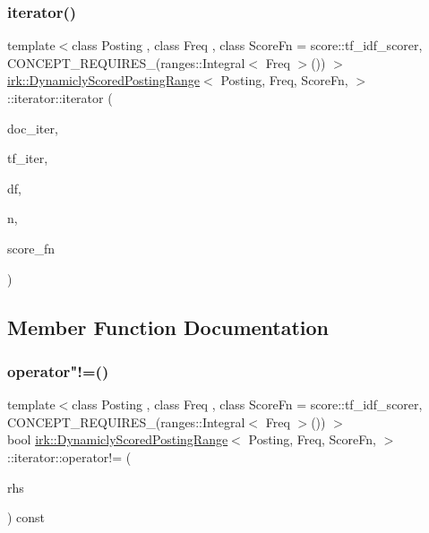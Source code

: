 \subsubsection{\texorpdfstring{iterator()}{iterator()}}
{\footnotesize\ttfamily template$<$class Posting , class Freq , class Score\+Fn  = score\+::tf\+\_\+idf\+\_\+scorer, C\+O\+N\+C\+E\+P\+T\+\_\+\+R\+E\+Q\+U\+I\+R\+E\+S\+\_\+(ranges\+::\+Integral$<$ Freq $>$()) $>$ \\
\mbox{\hyperlink{classirk_1_1DynamiclyScoredPostingRange}{irk\+::\+Dynamicly\+Scored\+Posting\+Range}}$<$ Posting, Freq, Score\+Fn, $>$\+::iterator\+::iterator (\begin{DoxyParamCaption}\item[{typename std\+::vector$<$ Doc $>$\+::const\+\_\+iterator}]{doc\+\_\+iter,  }\item[{typename std\+::vector$<$ Freq $>$\+::const\+\_\+iterator}]{tf\+\_\+iter,  }\item[{Freq}]{df,  }\item[{std\+::size\+\_\+t}]{n,  }\item[{Score\+Fn}]{score\+\_\+fn }\end{DoxyParamCaption})\hspace{0.3cm}{\ttfamily [inline]}}



\subsection{Member Function Documentation}
\mbox{\label{classirk_1_1DynamiclyScoredPostingRange_1_1iterator_ab24967cecf580cbfa019f5604695a964}} 
\subsubsection{\texorpdfstring{operator"!=()}{operator!=()}}
{\footnotesize\ttfamily template$<$class Posting , class Freq , class Score\+Fn  = score\+::tf\+\_\+idf\+\_\+scorer, C\+O\+N\+C\+E\+P\+T\+\_\+\+R\+E\+Q\+U\+I\+R\+E\+S\+\_\+(ranges\+::\+Integral$<$ Freq $>$()) $>$ \\
bool \mbox{\hyperlink{classirk_1_1DynamiclyScoredPostingRange}{irk\+::\+Dynamicly\+Scored\+Posting\+Range}}$<$ Posting, Freq, Score\+Fn, $>$\+::iterator\+::operator!= (\begin{DoxyParamCaption}\item[{const \mbox{\hyperlink{classirk_1_1DynamiclyScoredPostingRange_1_1iterator}{iterator}} \&}]{rhs }\end{DoxyParamCaption}) const\hspace{0.3cm}{\ttfamily [inline]}}

